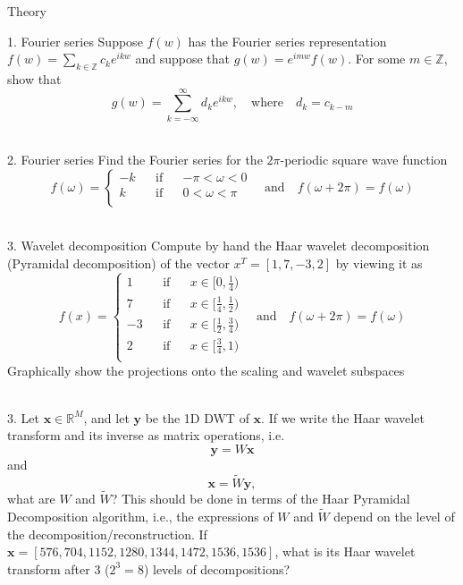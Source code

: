 \begin{section}{Theory}

\begin{homeworkSection}{1. Fourier series}
Suppose $f(w)$ has the Fourier series representation $f(w) = \sum_{k \in \mathbb{Z}} c_k e^{ikw}$ and suppose that $g(w) = e^{imw}f(w)$. For some $m \in \mathbb{Z}$, show that
$$
	g(w) = \sum_{k = -\infty}^{\infty} d_k e^{ikw}, \quad \text{where} \quad d_k = c_{k-m}
$$
\\
\problemAnswer{
}
\end{homeworkSection}

\begin{homeworkSection}{2. Fourier series}
Find the Fourier series for the $2\pi$-periodic square wave function 
$$
	f(\omega) = \left \lbrace \begin{matrix} -k && \text{if} && -\pi < \omega < 0\\
		k && \text{if} && 0 < \omega < \pi \\
	 \end{matrix} \right.
	\quad \text{and} \quad f(\omega + 2\pi) = f(\omega)
$$
\\
\problemAnswer{
}
\end{homeworkSection}

\begin{homeworkSection}{3. Wavelet decomposition}
Compute by hand the Haar wavelet decomposition (Pyramidal decomposition) of the vector $x^T = [1,7,−3,2]$ by viewing it as
$$
	f(x) = \left \lbrace 
	\begin{matrix} 
		1 && \text{if} && x \in [0,\frac{1}{4}) \\
		7 && \text{if} && x \in [\frac{1}{4}, \frac{1}{2}) \\
		-3 && \text{if} && x \in [\frac{1}{2},\frac{3}{4}) \\
		2 && \text{if} && x \in [\frac{3}{4},1) \\
	 \end{matrix} \right.
	\quad \text{and} \quad f(\omega + 2\pi) = f(\omega)
$$
Graphically show the projections onto the scaling and wavelet subspaces
\\
\\
\problemAnswer{ 
}
\end{homeworkSection}

\begin{homeworkSection}{3. }
Let $\bm{x} \in \mathbb{R}^M$, and let $\bm{y}$ be the 1D DWT of $\bm{x}$. If we write the Haar wavelet transform and its inverse as matrix operations, i.e.
$$ \bm{y} = W \bm{x} $$ and $$ \bm{x} = \tilde{W} \bm{y},$$
what are $W$ and $\tilde{W}$? This should be done in terms of the Haar Pyramidal Decomposition algorithm, i.e., the expressions of $W$ and $\tilde{W}$ depend on the level of the decomposition/reconstruction. If
\\ $\bm{x} = [576,704,1152,1280,1344,1472,1536,1536]$, what is its Haar wavelet transform after 3 ($2^3 = 8$) levels of decompositions?
\\
\\
\problemAnswer{ 
}
\end{homeworkSection}

\end{section}


